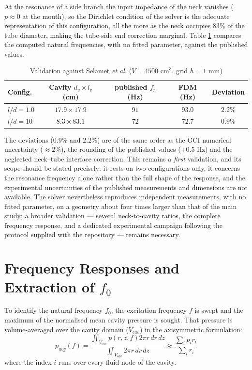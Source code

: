 \documentclass[11pt,a4paper,twocolumn]{article}
\begin{document}
At the resonance of a side branch the input impedance of the neck vanishes ($p\approx0$ at the mouth), so the Dirichlet condition of the solver is the adequate representation of this configuration, all the more as the neck occupies $83\%$ of the tube diameter, making the tube-side end correction marginal. Table \ref{tab:selamet} compares the computed natural frequencies, with no fitted parameter, against the published values.

\begin{table}[h]
\centering
\caption{Validation against Selamet \emph{et al.} \cite{selamet1997circular} ($V=4500$ cm$^3$, grid $h=1$ mm)}
\label{tab:selamet}
\begin{tabular}{lcccc}
\toprule
Config. & Cavity $d_v \times l_v$ (cm) & published $f_r$ (Hz) & FDM (Hz) & Deviation \\
\midrule
$l/d=1.0$ & $17.9 \times 17.9$ & $91$ & $93.0$ & $2.2\%$ \\
$l/d=10$ & $8.3 \times 83.1$ & $72$ & $72.7$ & $0.9\%$ \\
\bottomrule
\end{tabular}
\end{table}

The deviations ($0.9\%$ and $2.2\%$) are of the same order as the GCI numerical uncertainty ($\approx2\%$), the rounding of the published values ($\pm0.5$ Hz) and the neglected neck--tube interface correction. This remains a \emph{first} validation, and its scope should be stated precisely: it rests on two configurations only, it concerns the resonance frequency alone rather than the full shape of the response, and the experimental uncertainties of the published measurements and dimensions are not available. The solver nevertheless reproduces independent measurements, with no fitted parameter, on a geometry about four times larger than that of the main study; a broader validation --- several neck-to-cavity ratios, the complete frequency response, and a dedicated experimental campaign following the protocol supplied with the repository --- remains necessary.

\section{Frequency Responses and Extraction of \texorpdfstring{$f_0$}{f0}}
To identify the natural frequency $f_0$, the excitation frequency $f$ is swept and the maximum of the normalised mean cavity pressure is sought. That pressure is volume-averaged over the cavity domain ($V_{cav}$) in the axisymmetric formulation:
\begin{equation}
p_{avg}(f) = \frac{\iint_{V_{cav}} p(r,z,f) 2\pi r \, dr \, dz}{\iint_{V_{cav}} 2\pi r \, dr \, dz} \approx \frac{\sum_{i} p_i r_i}{\sum_{i} r_i}
\end{equation}
where the index $i$ runs over every fluid node of the cavity.
\end{document}
